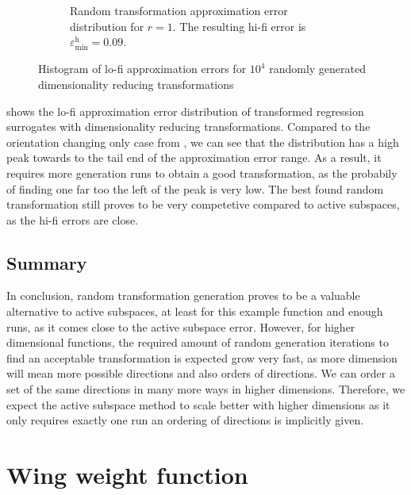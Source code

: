 \documentclass[
  a4paper,  %
  twoside,  %
  bibliography=totoc,
  headsepline,
  cleardoublepage=empty,
  parskip=half,
  draft=false
]{scrbook}
\begin{document}
\begin{mdframed}[style=style]
\begin{figure}[H]
\begin{subfigure}{.5\textwidth}
  \caption{Random transformation approximation error distribution for $r=1$. The resulting hi-fi error is $\varepsilon^\mathrm{h}_{\mathrm{min}}=0.09$.}
\vspace{3mm}
\label{fig:ishigami_hist_1}
\end{subfigure}
\delimit
\caption{Histogram of lo-fi approximation errors for $10^4$ randomly generated dimensionality reducing transformations}
\label{fig:ishigami_hist_12}
\end{figure}
\end{mdframed}
%
 shows the lo-fi approximation error distribution of transformed regression surrogates with dimensionality reducing transformations.
Compared to the orientation changing only case from , we can see that the distribution has a high peak towards to the tail end of the approximation error range.
As a result, it requires more generation runs to obtain a good transformation, as the probabily of finding one far too the left of the peak is very low.
The best found random transformation still proves to be very competetive compared to active subspaces, as the hi-fi errors are close.

\subsection{Summary}

In conclusion, random transformation generation proves to be a valuable alternative to active subspaces, at least for this example function and enough runs, as it comes close to the active subspace error.
However, for higher dimensional functions, the required amount of random generation iterations to find an acceptable transformation is expected grow very fast, as more dimension will mean more possible directions and also orders of directions.
We can order a set of the same directions in many more ways in higher dimensions.
Therefore, we expect the active subspace method to scale better with higher dimensions as it only requires exactly one run an ordering of directions is implicitly given.

\section{Wing weight function}
\end{document}
